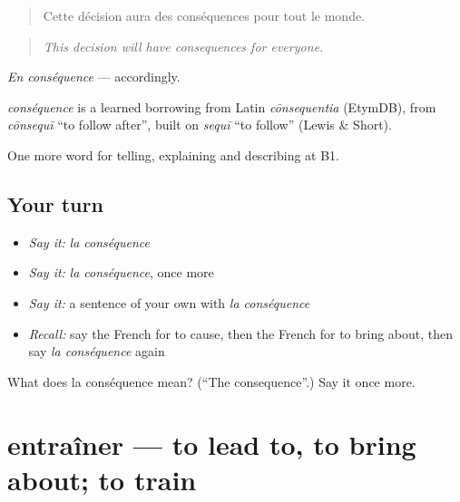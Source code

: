 \begin{quote}
Cette décision aura des conséquences pour tout le monde.
\end{quote}

\begin{quote}
\emph{This decision will have consequences for everyone.}
\end{quote}

\emph{En conséquence} — accordingly.

\begin{cousinweb}
\emph{conséquence} is a learned borrowing from Latin \emph{cōnsequentia} (EtymDB), from \emph{cōnsequī} \textquotedblleft{}to follow after\textquotedblright{}, built on \emph{sequī} \textquotedblleft{}to follow\textquotedblright{} (Lewis \& Short).
\end{cousinweb}

\begin{grammarlens}[title={What you've built}]
One more word for telling, explaining and describing at B1.
\end{grammarlens}

\subsection*{Your turn}
\begin{itemize}
\raggedright
  \item \emph{Say it:} \emph{la conséquence}
  \item \emph{Say it:} \emph{la conséquence}, once more
  \item \emph{Say it:} a sentence of your own with \emph{la conséquence}
  \item \emph{Recall:} say the French for to cause, then the French for to bring about, then say \emph{la conséquence} again
\end{itemize}

\begin{tcolorbox}[breakable,colback=teal!4,colframe=teal!35!black,title={Before you move on}]
What does la conséquence mean? (\textquotedblleft{}The consequence\textquotedblright{}.) Say it once more.
\end{tcolorbox}
\section[entraîner]{entraîner — to lead to, to bring about; to train}

\label{lesson:FR-C346-entrainer}




